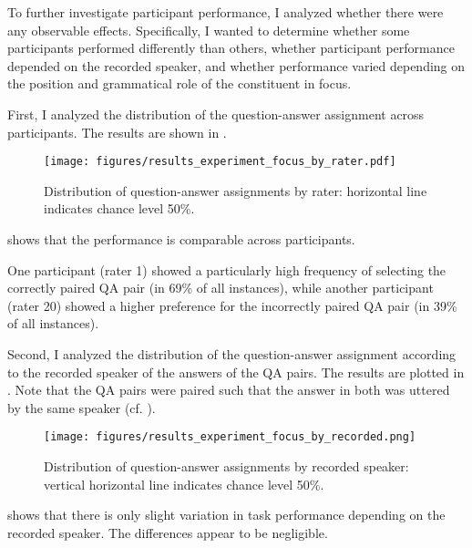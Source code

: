 To further investigate participant performance, I analyzed whether there were any observable effects. Specifically, I wanted to determine whether some participants performed differently than others, whether participant performance depended on the recorded speaker, and whether performance varied depending on the position and grammatical role of the constituent in focus.




First, I analyzed  the distribution of the question-answer assignment across participants. The results are shown in  .


\begin{figure}
	\texttt{[image: figures/results\_experiment\_focus\_by\_rater.pdf]}
	\caption{Distribution of question-answer assignments by rater: horizontal line indicates chance level 50\%.}
	\label{results_experiment_focus_by_rater}	
\end{figure}

 shows that the performance  is comparable across participants. 



One participant (rater 1) showed a particularly high frequency of selecting the correctly paired QA pair (in 69\% of all instances), while another participant (rater 20) showed a higher preference for the incorrectly paired QA pair (in 39\% of all instances).






Second, I analyzed the distribution of the question-answer assignment according to the recorded speaker of the answers of the QA pairs. The results are plotted in  . Note that the QA pairs were paired such that the answer in both was uttered by the same speaker (cf.  ).


\begin{figure}
	\texttt{[image: figures/results\_experiment\_focus\_by\_recorded.png]}
	\caption{Distribution of question-answer assignments by recorded speaker: vertical horizontal line indicates chance level 50\%.}
	\label{results_experiment_focus_by_speaker}	
\end{figure}

 shows that there is  only slight variation in task performance depending on the recorded speaker. The differences appear to be  negligible. 





